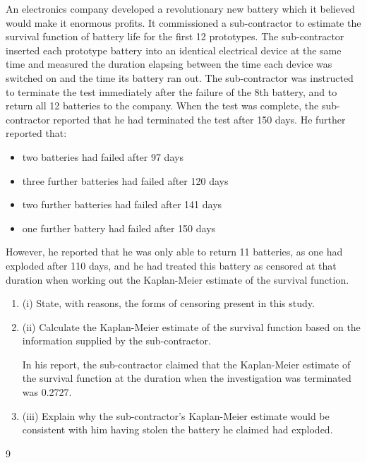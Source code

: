 \documentclass[a4paper,12pt]{article}
\begin{document}
 An electronics company developed a revolutionary new battery which it believed
would make it enormous profits. It commissioned a sub-contractor to estimate the
survival function of battery life for the first 12 prototypes. The sub-contractor
inserted each prototype battery into an identical electrical device at the same time and
measured the duration elapsing between the time each device was switched on and the time its battery ran out. The sub-contractor was instructed to terminate the test
immediately after the failure of the 8th battery, and to return all 12 batteries to the
company.
When the test was complete, the sub-contractor reported that he had terminated the
test after 150 days. He further reported that:
\begin{itemize}
    \item two batteries had failed after 97 days
\item three further batteries had failed after 120 days
\item two further batteries had failed after 141 days
\item one further battery had failed after 150 days

\end{itemize}
However, he reported that he was only able to return 11 batteries, as one had exploded
after 110 days, and he had treated this battery as censored at that duration when
working out the Kaplan-Meier estimate of the survival function.
\begin{enumerate}
\item (i) State, with reasons, the forms of censoring present in this study.

\item (ii) Calculate the Kaplan-Meier estimate of the survival function based on the
information supplied by the sub-contractor.

In his report, the sub-contractor claimed that the Kaplan-Meier estimate of the
survival function at the duration when the investigation was terminated was 0.2727.
\item (iii)
Explain why the sub-contractor’s Kaplan-Meier estimate would be consistent
with him having stolen the battery he claimed had exploded.
\end{enumerate}
\newpage
9
\end{document}
